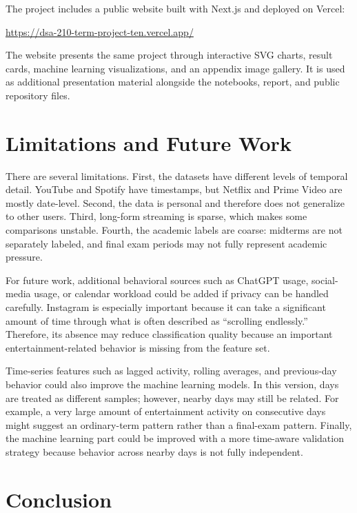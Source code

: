 \documentclass[11pt,a4paper]{article}
\begin{document}
The project includes a public website built with Next.js and deployed on Vercel:

\begin{center}
\url{https://dsa-210-term-project-ten.vercel.app/}
\end{center}

The website presents the same project through interactive SVG charts, result cards, machine learning visualizations, and an appendix image gallery. It is used as additional presentation material alongside the notebooks, report, and public repository files.

\section{Limitations and Future Work}

There are several limitations. First, the datasets have different levels of temporal detail. YouTube and Spotify have timestamps, but Netflix and Prime Video are mostly date-level. Second, the data is personal and therefore does not generalize to other users. Third, long-form streaming is sparse, which makes some comparisons unstable. Fourth, the academic labels are coarse: midterms are not separately labeled, and final exam periods may not fully represent academic pressure.

For future work, additional behavioral sources such as ChatGPT usage, social-media usage, or calendar workload could be added if privacy can be handled carefully. Instagram is especially important because it can take a significant amount of time through what is often described as ``scrolling endlessly.'' Therefore, its absence may reduce classification quality because an important entertainment-related behavior is missing from the feature set.

Time-series features such as lagged activity, rolling averages, and previous-day behavior could also improve the machine learning models. In this version, days are treated as different samples; however, nearby days may still be related. For example, a very large amount of entertainment activity on consecutive days might suggest an ordinary-term pattern rather than a final-exam pattern. Finally, the machine learning part could be improved with a more time-aware validation strategy because behavior across nearby days is not fully independent.

\section{Conclusion}
\end{document}
